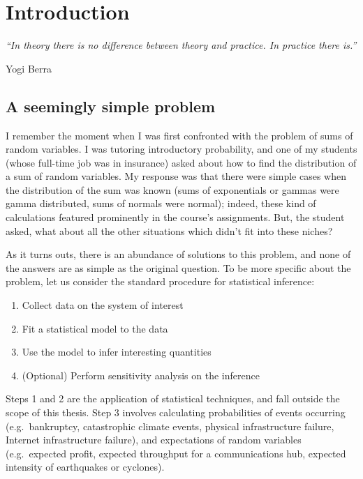 \chapter{Introduction} \label{chp:intro}

\setcounter{page}{1}

\begin{center}
\emph{``In theory there is no difference between theory and practice. In practice there is.''}
\end{center}
\hfill Yogi Berra~~~~~~~~

\section{A seemingly simple problem}

I remember the moment when I was first confronted with the problem of sums of random variables. I was tutoring introductory probability, and one of my students (whose full-time job was in insurance) asked about how to find the distribution of a sum of random variables. My response was that there were simple cases when the distribution of the sum was known (sums of exponentials or gammas were gamma distributed, sums of normals were normal); indeed, these kind of calculations featured prominently in the course's assignments. But, the student asked, what about all the other situations which didn't fit into these niches?

As it turns outs, there is an abundance of solutions to this problem, and none of the answers are as simple as the original question.
To be more specific about the problem, let us consider the standard procedure for statistical inference:
\begin{enumerate}
\item Collect data on the system of interest
\item Fit a statistical model to the data
\item Use the model to infer interesting quantities
\item (Optional) Perform sensitivity analysis on the inference
\end{enumerate}
Steps 1 and 2 are the application of statistical techniques, and fall outside the scope of this thesis. Step 3 involves calculating probabilities of events occurring (e.g.\ bankruptcy, catastrophic climate events, physical infrastructure failure, Internet infrastructure failure), and expectations of random variables (e.g.\ expected profit, expected throughput for a communications hub, expected intensity of earthquakes or cyclones).

